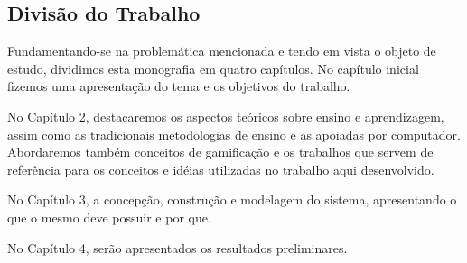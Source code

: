 \subsection{Divisão do Trabalho}

Fundamentando-se na problemática mencionada e tendo em vista o objeto de estudo, dividimos esta monografia em quatro capítulos. No capítulo inicial fizemos uma apresentação do tema e os objetivos do 
trabalho.

No Capítulo 2, destacaremos os aspectos teóricos sobre ensino e aprendizagem, assim como as tradicionais metodologias de ensino e as apoiadas por computador. Abordaremos tamb\'em conceitos 
de gamificação e os trabalhos que servem de refer\^encia para os conceitos e id\'eias utilizadas no trabalho aqui desenvolvido.

No Capítulo 3, a concepção, construção e modelagem do sistema, apresentando o que o mesmo deve possuir e por que.

No Capítulo 4, ser\~ao apresentados os resultados preliminares.